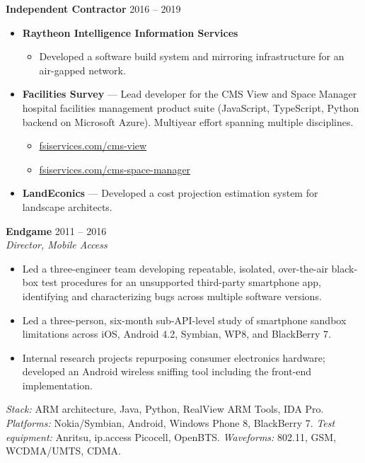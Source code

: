 \documentclass[11pt,letterpaper]{article}
\begin{document}
\noindent\textbf{\color{accent}Independent Contractor} \hfill {\small\color{accentlight}2016 -- 2019}
\begin{itemize}
  \item \textbf{Raytheon Intelligence Information Services}
    \begin{itemize}
      \item Developed a software build system and mirroring infrastructure for
            an air-gapped network.
    \end{itemize}
  \item \textbf{Facilities Survey} --- Lead developer for the CMS View and
        Space Manager hospital facilities management product suite
        (JavaScript, TypeScript, Python backend on Microsoft Azure).
        Multiyear effort spanning multiple disciplines.
    \begin{itemize}
      \item \href{https://www.fsiservices.com/cms-view}{fsiservices.com/cms-view}
      \item \href{https://www.fsiservices.com/cms-space-manager}{fsiservices.com/cms-space-manager}
    \end{itemize}
  \item \textbf{LandEconics} --- Developed a cost projection estimation system
        for landscape architects.
\end{itemize}

\noindent\textbf{\color{accent}Endgame} \hfill {\small\color{accentlight}2011 -- 2016}\\
\textit{Director, Mobile Access}
\begin{itemize}
  \item Led a three-engineer team developing repeatable, isolated,
        over-the-air black-box test procedures for an unsupported third-party
        smartphone app, identifying and characterizing bugs across multiple
        software versions.
  \item Led a three-person, six-month sub-API-level study of smartphone sandbox
        limitations across iOS, Android 4.2, Symbian, WP8, and BlackBerry 7.
  \item Internal research projects repurposing consumer electronics hardware;
        developed an Android wireless sniffing tool including the front-end
        implementation.
\end{itemize}
\textit{Stack:} ARM architecture, Java, Python, RealView ARM Tools, IDA Pro.
\textit{Platforms:} Nokia/Symbian, Android, Windows Phone 8, BlackBerry 7.
\textit{Test equipment:} Anritsu, ip.access Picocell, OpenBTS.
\textit{Waveforms:} 802.11, GSM, WCDMA/UMTS, CDMA.
\end{document}
